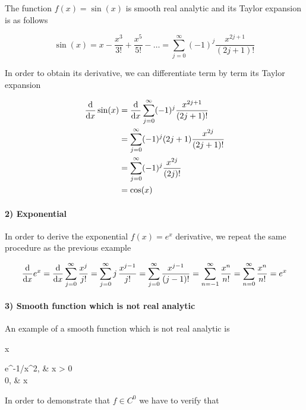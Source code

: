 The function $ f (x) = \sin(x) $ is smooth real analytic and its Taylor expansion is as follows

\begin{equation}
	\sin(x) = x - \dfrac{x^{3}}{3!} + \dfrac{x^{5}}{5!} - \dots %
	= \sum_{j=0}^{\infty} (-1)^{j} \dfrac{x^{2j+1}}{(2j+1)!}
\end{equation}

In order to obtain its derivative, we can differentiate term by term its Taylor expansion

\begin{align}
	\begin{split}
		\dv{x} \sin(x) &= \dv{x} \sum_{j=0}^{\infty} (-1)^{j} \dfrac{x^{2j+1}}{(2j+1)!} \\
		&= \sum_{j=0}^{\infty} (-1)^{j} (2j+1) \dfrac{x^{2j}}{(2j+1)!} \\
		&= \sum_{j=0}^{\infty} (-1)^{j} \dfrac{x^{2j}}{(2j)!} \\
		&= \cos(x)
	\end{split}
\end{align}

\paragraph{2) Exponential}

In order to derive the exponential $ f(x) = e^{x} $ derivative, we repeat the same procedure as the previous example

\begin{equation}
	\dv{x} e^{x} = \dv{x} \sum_{j=0}^{\infty}\dfrac{x^{j}}{j!} %
	= \sum_{j=0}^{\infty} j \, \dfrac{x^{j-1}}{j!} %
	= \sum_{j=0}^{\infty} \dfrac{x^{j-1}}{(j-1)!} %
	= \sum_{n=-1}^{\infty} \dfrac{x^{n}}{n!} %
	= \sum_{n=0}^{\infty} \dfrac{x^{n}}{n!} %
	= e^{x}
\end{equation}

\paragraph{3) Smooth function which is not real analytic}

An example of a smooth function which is not real analytic is

	{\R}{\R}
	{x}{%
		\begin{cases}
			e^{-1/x^{2}}, &  x > 0 \\
			0, &  x 
		\end{cases}
		}

In order to demonstrate that $ f \in C^{0} $ we have to verify that

